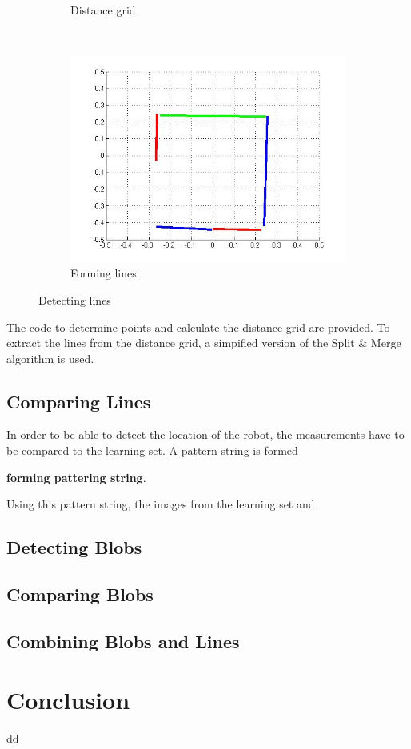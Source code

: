 \documentclass[12pt]{article}
\begin{document}
\begin{figure}[h!]
\begin{subfigure}[b]{0.3\textwidth}
            \caption{Distance grid}
            \label{fig:grid}
    \end{subfigure}
    ~
    \begin{subfigure}[b]{0.3\textwidth}
            \includegraphics[width=\textwidth]{lines.jpg}
            \caption{Forming lines}
            \label{fig:lines}
    \end{subfigure}
    \caption{Detecting lines}
\end{figure}

The code to determine points and calculate the distance grid are provided. To extract the lines from the distance grid, a simpified version of the Split \& Merge algorithm is used. 

 
\subsection{Comparing Lines}
In order to be able to detect the location of the robot, the measurements have to be compared to the learning set. A pattern string is formed

\textbf{forming pattering string}.

Using this pattern string, the images from the learning set and 

\subsection{Detecting Blobs}

\subsection{Comparing Blobs}

\subsection{Combining Blobs and Lines}
\section{Conclusion}
dd
\end{document}
